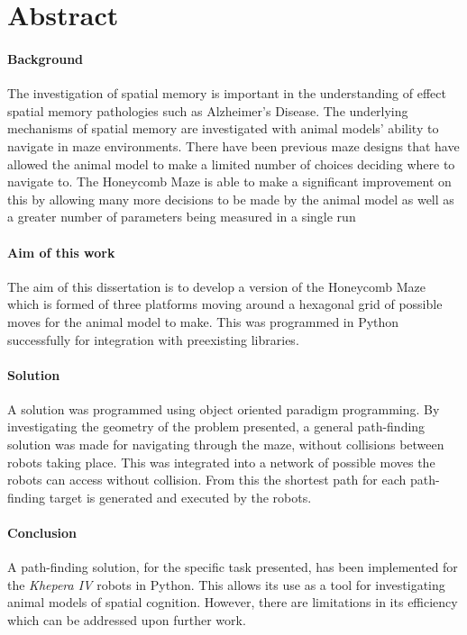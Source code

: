 \section*{Abstract}

\paragraph{Background}
The investigation of spatial memory is important in the understanding of effect spatial memory pathologies such as Alzheimer's Disease. The underlying mechanisms of spatial memory are investigated with animal models' ability to navigate in maze environments. 
There have been previous maze designs that have allowed the animal model to make a limited number of choices deciding where to navigate to. The Honeycomb Maze is able to make a significant improvement on this by allowing many more decisions to be made by the animal model as well as a greater number of parameters being measured in a single run 
\paragraph{Aim of this work}
The aim of this dissertation is to develop a version of the Honeycomb Maze which is formed of three platforms moving around a hexagonal grid of possible moves for the animal model to make. This was programmed in Python successfully for integration with preexisting libraries.

\paragraph{Solution}
A solution was programmed using object oriented paradigm programming. By investigating the geometry of the problem presented, a general path-finding solution was made for navigating through the maze, without collisions between robots taking place. This was integrated into a network of possible moves the robots can access without collision. From this the shortest path for each path-finding target is generated and executed by the robots.


\paragraph{Conclusion}
A path-finding solution, for the specific task presented, has been implemented for the \textit{Khepera IV} robots in Python. This allows its use as a tool for investigating animal models of spatial cognition. However, there are limitations in its efficiency which can be addressed upon further work.



